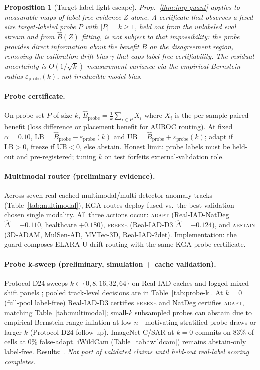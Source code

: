 \documentclass[conference]{IEEEtran}
\theoremstyle{plain}
\newtheorem{proposition}{Proposition}
\theoremstyle{definition}
\begin{document}
\begin{proposition}[Target-label-light escape]\label{prop:tll-escape}
Prop.~\ref{thm:imp-quant} applies to measurable maps of label-free evidence $Z$ alone. A certificate
that observes a fixed-size target-labeled probe $P$ with $|P|{=}k{\ge}1$, held out from the unlabeled
eval stream and from $\widehat{B}(Z)$ fitting, is not subject to that impossibility: the probe
provides direct information about the benefit $B$ on the disagreement region, removing the
calibration-drift bias $\gamma$ that caps label-free certifiability. The residual uncertainty is
$O(1/\sqrt{k})$ measurement variance via the empirical-Bernstein radius $\varepsilon_{\mathrm{probe}}(k)$,
not irreducible model bias.
\end{proposition}

\paragraph{Probe certificate.}
On probe set $P$ of size $k$,
$\widehat{B}_{\mathrm{probe}}{=}\frac{1}{k}\sum_{i\in P} X_i$ where $X_i$ is the per-sample paired
benefit (loss difference or placement benefit for AUROC routing). At fixed $\alpha{=}0.10$,
$\mathrm{LB}{=}\widehat{B}_{\mathrm{probe}}{-}\varepsilon_{\mathrm{probe}}(k)$ and
$\mathrm{UB}{=}\widehat{B}_{\mathrm{probe}}{+}\varepsilon_{\mathrm{probe}}(k)$; adapt if
$\mathrm{LB}{>}0$, freeze if $\mathrm{UB}{<}0$, else abstain. Honest limit: probe labels must be
held-out and pre-registered; tuning $k$ on test forfeits external-validation role.

\paragraph{Multimodal router (preliminary evidence).}
Across seven real cached multimodal/multi-detector anomaly tracks
(Table~\ref{tab:multimodal}), \textsc{KGA} routes deploy-fused vs.\ the best validation-chosen
single modality. All three actions occur: \textsc{adapt} (Real-IAD-NatDeg $\hat\Delta{=}{+}0.110$,
healthcare ${+}0.180$), \textsc{freeze} (Real-IAD-D3 $\hat\Delta{=}{-}0.124$), and \textsc{abstain}
(3D-ADAM, MulSen-AD, MVTec-3D, Real-IAD-2det). Implementation:
the guard composes ELARA-U drift routing with the same \textsc{KGA} probe certificate.

\paragraph{Probe k-sweep (preliminary, simulation + cache validation).}
Protocol D24 sweeps $k\in\{0,8,16,32,64\}$ on Real-IAD caches and logged mixed-shift panels
; pooled track-level decisions are in
Table~\ref{tab:probe-k}. At $k{=}0$ (full-pool label-free) Real-IAD-D3 certifies \textsc{freeze} and
NatDeg certifies \textsc{adapt}, matching Table~\ref{tab:multimodal}; small-$k$ subsampled probes can
abstain due to empirical-Bernstein range inflation at low $n$---motivating stratified probe draws or
larger $k$ (Protocol D24 follow-up). ImageNet-C/SAR at $k{=}0$ commits on $83\%$ of cells at
$0\%$ false-adapt. iWildCam (Table~\ref{tab:iwildcam}) remains abstain-only label-free. Results:
. \emph{Not part of validated
claims until held-out real-label scoring completes.}
\end{document}

